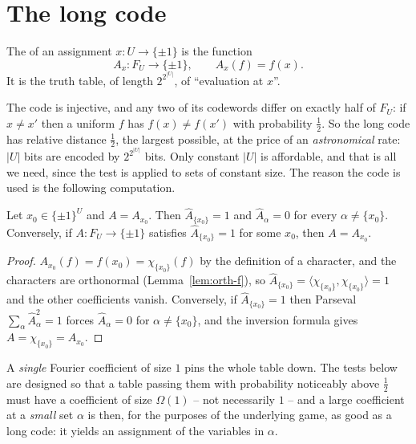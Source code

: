 \section{The long code}
\label{sec:longcode}

\begin{definition}\label{def:longcode}
The  of an assignment $x\colon U\to\{\pm1\}$ is the function
\[
  A_x\colon F_U\to\{\pm1\},\qquad A_x(f)=f(x).
\]
It is the truth table, of length $2^{2^{|U|}}$, of ``evaluation at $x$''.
\end{definition}

\noindent
The code is injective, and any two of its codewords differ on exactly half of $F_U$: if $x\ne x'$ then a uniform $f$ has $f(x)\ne f(x')$ with probability $\tfrac12$.  So the long code has relative distance $\tfrac12$, the largest possible, at the price of an \emph{astronomical} rate: $|U|$ bits are encoded by $2^{2^{|U|}}$ bits.
Only constant $|U|$ is affordable, and that is all we need, since the test is applied to sets of constant size.  The reason the code is used is the following computation.

\begin{lemma}\label{lem:longcode-fourier}
Let $x_0\in\{\pm1\}^U$ and $A=A_{x_0}$.  Then $\widehat A_{\{x_0\}}=1$ and $\widehat A_\alpha=0$ for every $\alpha\ne\{x_0\}$.  Conversely, if $A\colon F_U\to\{\pm1\}$ satisfies $\widehat A_{\{x_0\}}=1$ for some $x_0$, then $A=A_{x_0}$.
\end{lemma}
\begin{proof}
$A_{x_0}(f)=f(x_0)=\chi_{\{x_0\}}(f)$ by the definition of a character, and the characters are orthonormal (Lemma~\ref{lem:orth-f}), so $\widehat A_{\{x_0\}}=\langle\chi_{\{x_0\}},\chi_{\{x_0\}}\rangle=1$ and the other coefficients vanish.
Conversely, if $\widehat A_{\{x_0\}}=1$ then Parseval $\sum_\alpha\widehat A_\alpha^2=1$ forces $\widehat A_\alpha=0$ for $\alpha\ne\{x_0\}$, and the inversion formula gives $A=\chi_{\{x_0\}}=A_{x_0}$.
\end{proof}

\noindent
A \emph{single} Fourier coefficient of size $1$ pins the whole table down.  The tests below are designed so that a table passing them with probability noticeably above $\tfrac12$ must have a coefficient of size $\Omega(1)$ -- not necessarily $1$ -- and a large coefficient at a \emph{small} set $\alpha$ is then, for the purposes of the underlying game, as good as a long code: it yields an assignment of the variables in $\alpha$.

